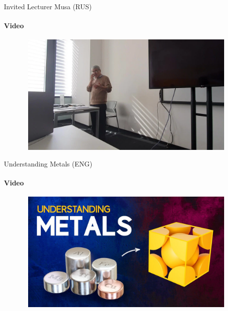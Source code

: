 \documentclass[aspectratio=169]{beamer}
\begin{document}
    \begin{frame}[t]{Invited Lecturer Musa (RUS)}
        \framesubtitle{Video}
        \vspace{-0.6cm}
        \begin{figure}[H]
            \href{https://disk.yandex.ru/i/RtD8vtzjY-XxyQ}{
                \centering\includegraphics[height=6cm,width=1\textwidth,keepaspectratio]{musa_lec_2_video.png}}
            \label{fig:musa_lec_2_video.png}
        \end{figure}
    \end{frame}

\begin{frame}[t]{Understanding Metals (ENG)}
    \framesubtitle{Video}
    \vspace{-0.6cm}
    \begin{figure}[H]
        \href{https://youtu.be/PaGJwOPg2kU}{
            \centering\includegraphics[height=6cm,width=1\textwidth,keepaspectratio]{understand_metals_video.jpg}}
        \label{fig:understand_metals_video.jpg}
    \end{figure}
\end{frame}
\end{document}
